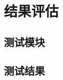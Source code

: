 \documentclass[12pt]{article} %
\begin{document}
\begin{sloppypar}
\newpage
\section{结果评估}

\subsection{测试模块}

\subsection{测试结果}

\newpage
 


\end{sloppypar}
\end{document}

